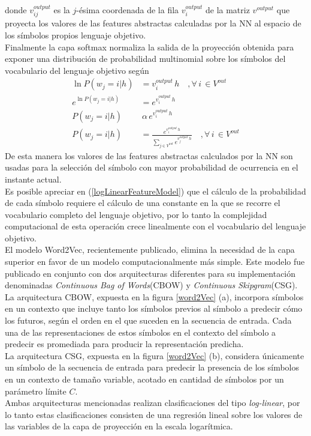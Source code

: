 \documentclass{article}
\begin{document}
	donde $v^{output}_{ij}$ es la $j$-ésima coordenada de la fila $v^{output}_i$ de la matriz $v^{output}$ que proyecta los valores de las features abstractas calculadas por la NN al espacio de los símbolos propios lenguaje objetivo.\\
	Finalmente la capa softmax normaliza la salida de la proyección obtenida para exponer una distribución de probabilidad multinomial sobre los símbolos del vocabulario del lenguaje objetivo según
	\begin{equation}\label{logLinearFeatureModel}
	\begin{split}
	\ln P(w_j = i | h) &= v^{output}_i \, h  \quad , \forall \,i \, \in V^{out}\\
	e^{\ln P(w_j = i | h)} &= e^{v^{output}_i \, h}\\
	P(w_j = i | h) &\,\alpha\, e^{v^{output}_i \, h}\\
	P(w_j = i | h) &= \displaystyle\frac{e^{v^{output}_i \, h}}{\displaystyle\sum_{j \in V^{out}} e^{v^{output}_j \, h}} \quad , \forall \, i \, \in V^{out}
	\end{split} 
	\end{equation}
	De esta manera los valores de las features abstractas calculados por la NN son usadas para la selección del símbolo con mayor probabilidad de ocurrencia en el instante actual.\\
	Es posible apreciar en (\ref{logLinearFeatureModel}) que el cálculo de la probabilidad de cada símbolo requiere el cálculo de una constante en la que se recorre el vocabulario completo del lenguaje objetivo, por lo tanto la complejidad computacional de esta operación crece linealmente con el vocabulario del lenguaje objetivo.\\
	
	El modelo Word2Vec, recientemente publicado\cite{38MikolovFormer}, elimina la necesidad de la capa superior en favor de un modelo computacionalmente más simple. Este modelo fue publicado en conjunto con dos arquitecturas diferentes para su implementación denominadas \textit{Continuous Bag of Words}(CBOW) y \textit{Continuous Skipgram}(CSG).\\
	La arquitectura CBOW, expuesta en la figura \ref{word2Vec} (a), incorpora símbolos en un contexto que incluye tanto los símbolos previos al símbolo a predecir cómo los futuros, según el orden en el que suceden en la secuencia de entrada. Cada una de las representaciones de estos símbolos en el contexto del símbolo a predecir es promediada para producir la representación predicha.\\
	La arquitectura CSG, expuesta en la figura \ref{word2Vec} (b), considera únicamente un símbolo de la secuencia de entrada para predecir la presencia de los símbolos en un contexto de tamaño variable, acotado en cantidad de símbolos por un parámetro límite $C$.\\
	Ambas arquitecturas mencionadas realizan clasificaciones del tipo \textit{log-linear}, por lo tanto estas clasificaciones consisten de una regresión lineal sobre los valores de las variables de la capa de proyección en la escala logarítmica.\\
	
\end{document}

